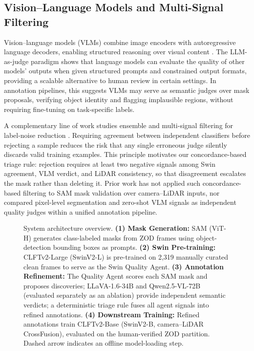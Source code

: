 \documentclass[conference]{IEEEtran}
\begin{document}
\subsection{Vision--Language Models and Multi-Signal Filtering}

Vision--language models (VLMs) combine image encoders with autoregressive language decoders, enabling structured reasoning over visual content \cite{liu2024llava,ye2023mplug,wang2024qwen2vl}. 
The LLM-as-judge paradigm \cite{zheng2023judging} shows that language models can evaluate the quality of other models' outputs when given structured prompts and constrained output formats, providing a scalable alternative to human review in certain settings. 
In annotation pipelines, this suggests VLMs may serve as semantic judges over mask proposals, verifying object identity and flagging implausible regions, without requiring fine-tuning on task-specific labels.

A complementary line of work studies ensemble and multi-signal filtering for label-noise reduction \cite{malach2017decoupling,han2018co}. 
Requiring agreement between independent classifiers before rejecting a sample reduces the risk that any single erroneous judge silently discards valid training examples. 
This principle motivates our concordance-based triage rule: rejection requires at least two negative signals among Swin agreement, VLM verdict, and LiDAR consistency, so that disagreement escalates the mask rather than deleting it. 
Prior work has not applied such concordance-based filtering to SAM mask validation over camera--LiDAR inputs, nor compared pixel-level segmentation and zero-shot VLM signals as independent quality judges within a unified annotation pipeline.

\begin{figure}[t]
    \centering
    \resizebox{\columnwidth}{!}{}
    \caption{System architecture overview.
             \textbf{(1) Mask Generation:} SAM (ViT-H) generates class-labeled masks from ZOD frames using object-detection bounding boxes as prompts.
             \textbf{(2) Swin Pre-training:} CLFTv2-Large (SwinV2-L) is pre-trained on 2{,}319 manually curated clean frames to serve as the Swin Quality Agent.
             \textbf{(3) Annotation Refinement:} The Quality Agent scores each SAM mask and proposes discoveries; LLaVA-1.6-34B and Qwen2.5-VL-72B (evaluated separately as an ablation) provide independent semantic verdicts; a deterministic triage rule fuses all agent signals into refined annotations.
             \textbf{(4) Downstream Training:} Refined annotations train CLFTv2-Base (SwinV2-B, camera--LiDAR CrossFusion), evaluated on the human-verified ZOD partition.
             Dashed arrow indicates an offline model-loading step.}
    \label{fig:architecture_overview}
\end{figure}
\end{document}
